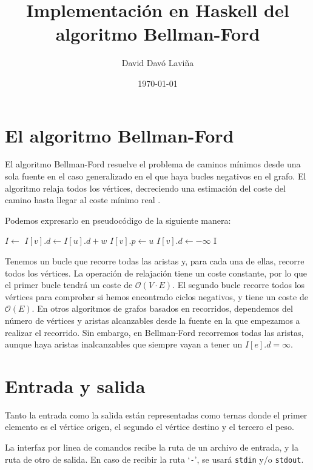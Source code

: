 \documentclass{article}
\title{Implementación en Haskell del algoritmo Bellman-Ford}
\author{David Davó Laviña}
\date{\today{}}
\begin{document}
\section{El algoritmo Bellman-Ford}
\label{sec:algor}
El algoritmo Bellman-Ford resuelve el problema de caminos mínimos desde una sola fuente en el caso generalizado en el que haya bucles negativos en el grafo. El algoritmo relaja todos los vértices, decreciendo una estimación del coste del camino hasta llegar al coste mínimo real \cite{CormenBellmanFord}.

Podemos expresarlo en pseudocódigo de la siguiente manera:

\vspace{3mm}
\begin{algorithmic}
	\State $I\gets$
				\State $I[v].d\gets I[u].d + w$
				\State $I[v].p\gets u$
			\EndIf
		\EndFor
	\EndFor
			\State $I[v].d\gets-\infty$
		\EndIf
	\EndFor
	\State\Return I
\EndFunction
\end{algorithmic}
\vspace{3mm}

Tenemos un bucle que recorre todas las aristas y, para cada una de ellas, recorre todos los vértices. La operación de relajación tiene un coste constante, por lo que el primer bucle tendrá un coste de $\mathcal{O}\left(V\cdot E\right)$. El segundo bucle recorre todos los vértices para comprobar si hemos encontrado ciclos negativos, y tiene un coste de $\mathcal{O}\left(E\right)$. En otros algoritmos de grafos basados en recorridos, dependemos del número de vértices y aristas alcanzables desde la fuente en la que empezamos a realizar el recorrido. Sin embargo, en Bellman-Ford recorremos todas las aristas, aunque haya aristas inalcanzables que siempre vayan a tener un $I[e].d = \infty$.

\section{Entrada y salida}
Tanto la entrada como la salida están representadas como ternas donde el primer elemento es el vértice origen, el segundo el vértice destino y el tercero el peso.

La interfaz por linea de comandos recibe la ruta de un archivo de entrada, y la ruta de otro de salida. En caso de recibir la ruta `\texttt{-}', se usará \texttt{stdin} y/o \texttt{stdout}.
\end{document}
